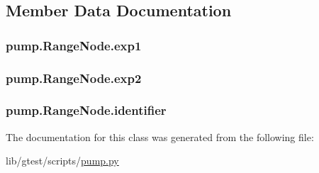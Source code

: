 \subsection{Member Data Documentation}
\hypertarget{classpump_1_1_range_node_acbb59f8c5e23d23563ca03f21574ce63}{
\subsubsection[{exp1}]{\setlength{\rightskip}{0pt plus 5cm}pump.\-Range\-Node.\-exp1}}\label{classpump_1_1_range_node_acbb59f8c5e23d23563ca03f21574ce63}
\hypertarget{classpump_1_1_range_node_afe153ee472b121652a51c62c1522cc13}{
\subsubsection[{exp2}]{\setlength{\rightskip}{0pt plus 5cm}pump.\-Range\-Node.\-exp2}}\label{classpump_1_1_range_node_afe153ee472b121652a51c62c1522cc13}
\hypertarget{classpump_1_1_range_node_ae75b9f31ba8c3bd048cf09b22035efa0}{
\subsubsection[{identifier}]{\setlength{\rightskip}{0pt plus 5cm}pump.\-Range\-Node.\-identifier}}\label{classpump_1_1_range_node_ae75b9f31ba8c3bd048cf09b22035efa0}


The documentation for this class was generated from the following file\-:\begin{DoxyCompactItemize}
\item 
lib/gtest/scripts/\hyperlink{pump_8py}{pump.\-py}\end{DoxyCompactItemize}
